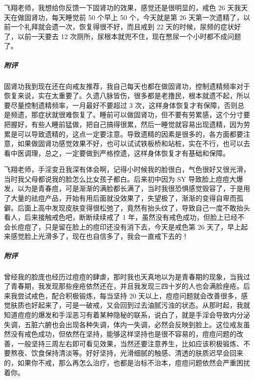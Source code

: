 \begin{case}
    飞翔老师，我想给你反馈一下固肾功的效果，感觉还是很明显的，戒色 26 天我天天在做固肾功，每天睡觉前 50 个早上 50 个，今天就是第 26 天第一次遗精了，以前一个礼拜就会遗一次，恢复得很不好，而且戒到 22 天的时候，尿频的症状好了，以前一天要去 12 次厕所，尿根本就兜不住，现在憋尿一个小时都不成问题了。
    \subparagraph{附评} 固肾功我到现在还在向戒友推荐，我自己每天也都在做固肾功，控制遗精频率对于恢复来说，实在太重要了。久遗八脉皆伤，很多都是老撸民，根本就遗不起，所以要尽量控制遗精频率，一月最好不要超过 3 次，这样身体恢复才有保障，否则总是频遗，那症状就很难恢复了。睡前可以做固肾功，但不要有劳累感，这个分寸要把握好，有些人睡前猛做，把自己搞得很累，然后一睡觉就容易出现遗精，因为劳累是可以导致遗精的，这点一定要注意。导致遗精的因素是很多的，各方面都要注意，如果做固肾功感觉效果不好，也可以试试铁板桥和站桩，实在不行，也可以去看中医调理，总之，一定要做到严格控遗，这样身体恢复才有基础和保障。
\end{case}

\begin{case}
    飞翔老师，手淫变丑我深有体会啊，记得小时候我的脸很白，气色很好又很光滑，当时我父母都说我的脸怎么比女孩子都白。后来初中因为 SY 导致脸上痘痘大爆发，以为是青春痘，可是渐渐的满脸都长满了，当时我很恐惧感觉毁容了，于是用了大量的祛痘产品，开始有用后面就没效果了，失望极了，渐渐的变得自卑而孤僻。后面上高中发现皮肤变得很松弛了，竟然有抬头纹了，导致自己一度不敢抬头看人，后来接触戒色吧，断断续续戒了 1 年，虽然没有戒色成功，但脸上已经不会长痘痘了，只是留在脸上的痘印还没有消下去，今天是戒色第 26 天了，早上起来感觉脸上光滑多了，现在也自信多了，我会一直戒下去的！
    \subparagraph{附评} 曾经我的脸庞也经历过痘痘的肆虐，那时我也天真地以为是青春期的现象，当我过了青春期，我发现那些痤疮依然还在，并且我发现三四十岁的人也会满脸痤疮。后来我尝试戒色，配合积极锻炼，每当坚持 20 天以上，痘痘问题就会改善很多，感觉肤质也好起来了，可是一破戒，又会回到过去油腻污浊的状态。从那时起，我就知道痘痘的爆发和手淫恶习有着某种隐秘的联系，说白了，就是手淫会导致内分泌失调，五脏六腑也会出现各种失调，体内一失调，必然会反映到脸上。这位戒友虽然没有戒色成功，但依然在坚持，能够这样坚持也是很不容易的，痘痘问题的改善，一般坚持三周左右即可看见效果，当然还要注意养生，比如应该积极锻炼、不要熬夜、饮食保持清淡等。好好坚持，光滑细腻的触感、清透的肤质迟早会回来的，如果你不戒，那么再怎么治疗，也都是治标不治本，痘痘问题依然会严重困扰着你。
\end{case}


